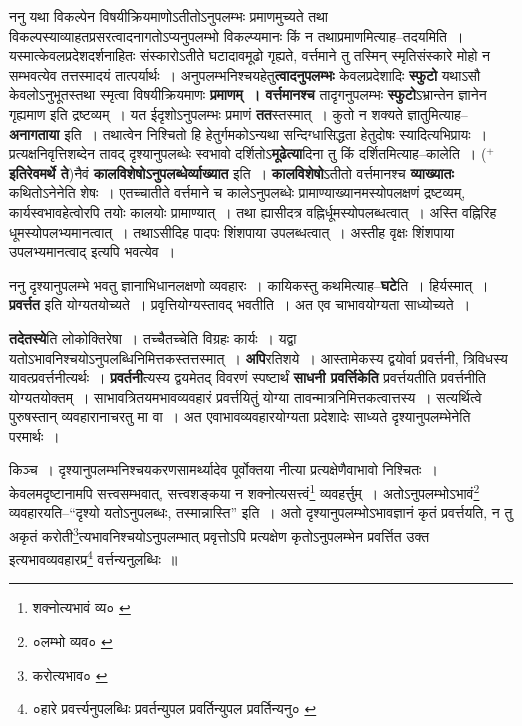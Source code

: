\documentclass[article,12pt,a4paper]{memoir}
\newcommand{\add}[1]{($^{+}$#1)}
\begin{document}
	  \pstart ननु यथा विकल्पेन विषयीक्रियमाणोऽतीतोऽनुपलम्भः प्रमाणमुच्यते तथा विकल्पस्याव्याहतप्रसरत्वादनागतोऽप्यनुपलम्भो विकल्प्यमानः किं न तथाप्रमाणमित्याह--तदयमिति । यस्मात्केवलप्रदेशदर्शनाहितः संस्कारोऽतीते घटादावमूढो गृह्यते, वर्त्तमाने तु तस्मिन् स्मृतिसंस्कारे मोहो न सम्भवत्येव तत्तस्मादयं तात्पर्यार्थः । अनुपलम्भनिश्चयहेतु\textbf{त्वादनुपलम्भः} केवलप्रदेशादिः \textbf{स्फुटो} यथाऽसौ केवलोऽनुभूतस्तथा स्मृत्वा विषयीक्रियमाणः \textbf{प्रमाणम् । वर्त्तमानश्च} तादृगनुपलम्भः \textbf{स्फुटो}ऽभ्रान्तेन ज्ञानेन गृह्यमाण इति द्रष्टव्यम् । यत ईदृशोऽनुपलम्भः प्रमाणं \textbf{तत}स्तस्मात् । कुतो न शक्यते ज्ञातुमित्याह--\textbf{अनागताया} इति । तथात्वेन निश्चितो हि हेतुर्गमकोऽन्यथा सन्दिग्धासिद्धता हेतुदोषः स्यादित्यभिप्रायः । प्रत्यक्षनिवृत्तिशब्देन तावद् दृश्यानुपलब्धेः स्वभावो दर्शितोऽ\textbf{मूढेत्या}दिना तु किं दर्शितमित्याह--कालेति । \add{\textbf{इतिरेवमर्थे ते}}नैवं \textbf{कालविशेषोऽनुपलब्धेर्व्याख्यात} इति । \textbf{कालविशेषो}ऽतीतो वर्त्तमानश्च \textbf{व्याख्यातः} कथितोऽनेनेति शेषः । एतच्चातीते वर्त्तमाने च कालेऽनुपलब्धेः प्रामाण्याख्यानमस्योपलक्षणं द्रष्टव्यम्, कार्यस्वभावहेत्वोरपि तयोः कालयोः प्रामाण्यात् । तथा ह्यासीदत्र वह्निर्धूमस्योपलब्धत्वात् । अस्ति वह्निरिह धूमस्योपलभ्यमानत्वात् । तथाऽसीदिह पादपः शिंशपाया उपलब्धत्वात् । अस्तीह वृक्षः शिंशपाया उपलभ्यमानत्वाद् इत्यपि भवत्येव ।
	\pend
      

	  \pstart ननु दृश्यानुपलम्भे भवतु ज्ञानाभिधानलक्षणो व्यवहारः । कायिकस्तु कथमित्याह--\textbf{घटे}ति । हिर्यस्मात् । \textbf{प्रवर्त्तत} इति योग्यतयोच्यते । प्रवृत्तियोग्यस्तावद् भवतीति । अत एव चाभावयोग्यता साध्योच्यते ।
	\pend
      

	  \pstart \textbf{तदेतस्ये}ति लोकोक्तिरेषा । तच्चैतच्चेति विग्रहः कार्यः । यद्वा यतोऽभावनिश्चयोऽनुपलब्धिनिमित्तकस्तत्तस्मात् । \textbf{अपि}रतिशये । आस्तामेकस्य द्वयोर्वा प्रवर्त्तनी, त्रिविधस्य यावत्प्रवर्त्तनीत्यर्थः । \textbf{प्रवर्तनी}त्यस्य द्वयमेतद् विवरणं स्पष्टार्थं \textbf{साधनी प्रवर्त्तिके}\leavevmode{}\textbf{ति} प्रवर्त्तयतीति प्रवर्त्तनीति योग्यतयोक्तम् । साभावत्रितयमभावव्यवहारं प्रवर्त्तयितुं योग्या तावन्मात्रनिमित्तकत्वात्तस्य । सत्यर्थित्वे पुरुषस्तान् व्यवहारानाचरतु मा वा । अत एवाभावव्यवहारयोग्यता प्रदेशादेः साध्यते दृश्यानुपलम्भेनेति परमार्थः ।
	\pend
      \leavevmode{}
	  \bigskip
	  \begingroup
	

	  \pstart किञ्च । दृश्यानुपलम्भनिश्चयकरणसामर्थ्यादेव पूर्वोक्तया नीत्या प्रत्यक्षेणैवाभावो निश्चितः । केवलमदृष्टानामपि सत्त्वसम्भवात्, सत्त्वशङ्कया न शक्नोत्यसत्त्वं\footnote{शक्नोत्यभावं व्य० \cite{dp-msC}} व्यवहर्त्तुम् । अतोऽनुपलम्भोऽभावं\footnote{०लम्भो व्यव० \cite{dp-msA}} व्यवहारयति--“दृश्यो यतोऽनुपलब्धः, तस्मान्नास्ति” इति । अतो दृश्यानुपलम्भोऽभावज्ञानं कृतं प्रवर्त्तयति, न तु अकृतं करोती\footnote{करोत्यभाव० \cite{dp-msC}}त्यभावनिश्चयोऽनुपलम्भात् प्रवृत्तोऽपि प्रत्यक्षेण कृतोऽनुपलम्भेन प्रवर्त्तित उक्त इत्यभावव्यवहारप्र\footnote{०हारे प्रवर्त्त्यनुपलब्धिः \cite{dp-msC} प्रवर्तन्युपल \cite{dp-msA} प्रवर्तिन्युपल \cite{dp-edP} \cite{dp-edH} प्रवर्तिन्यनु० \cite{dp-msB}} वर्त्तन्यनुलब्धिः ॥
	\pend
       
\end{document}
